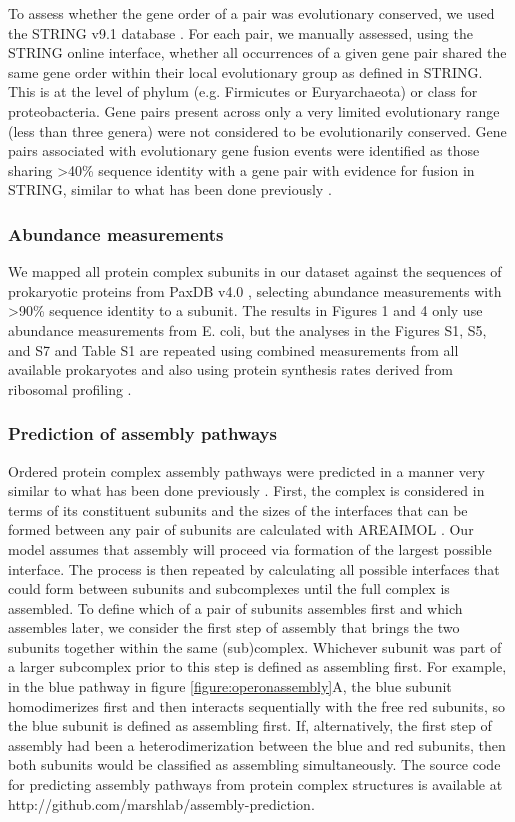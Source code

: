 \documentclass[a4paper,11pt,twoside,openright]{scrbook}
\begin{document}
To assess whether the gene order of a pair was evolutionary conserved, we used the STRING v9.1 database \cite{Franceschini2013}. For each pair, we manually assessed, using the STRING online interface, whether all occurrences of a given gene pair shared the same gene order within their local evolutionary group as defined in STRING. This is at the level of phylum (e.g. Firmicutes or Euryarchaeota) or class for proteobacteria. Gene pairs present across only a very limited evolutionary range (less than three genera) were not considered to be evolutionarily conserved. Gene pairs associated with evolutionary gene fusion events were identified as those sharing >40\% sequence identity with a gene pair with evidence for fusion in STRING, similar to what has been done previously \cite{Marsh2013}.

\subsubsection{Abundance measurements}
We mapped all protein complex subunits in our dataset against the sequences of prokaryotic proteins from PaxDB v4.0 \cite{Wang2015}, selecting abundance measurements with >90\% sequence identity to a subunit. The results in Figures 1 and 4 only use abundance measurements from E. coli, but the analyses in the Figures S1, S5, and S7 and Table S1 are repeated using combined measurements from all available prokaryotes and also using protein synthesis rates derived from ribosomal profiling \cite{Li2014b}.

\subsubsection{Prediction of assembly pathways}
Ordered protein complex assembly pathways were predicted in a manner very similar to what has been done previously \cite{Marsh2013}. First, the complex is considered in terms of its constituent subunits and the sizes of the interfaces that can be formed between any pair of subunits are calculated with AREAIMOL \cite{Winn2011}. Our model assumes that assembly will proceed via formation of the largest possible interface. The process is then repeated by calculating all possible interfaces that could form between subunits and subcomplexes until the full complex is assembled. To define which of a pair of subunits assembles first and which assembles later, we consider the first step of assembly that brings the two subunits together within the same (sub)complex. Whichever subunit was part of a larger subcomplex prior to this step is defined as assembling first. For example, in the blue pathway in figure \ref{figure:operonassembly}A, the blue subunit homodimerizes first and then interacts sequentially with the free red subunits, so the blue subunit is defined as assembling first. If, alternatively, the first step of assembly had been a heterodimerization between the blue and red subunits, then both subunits would be classified as assembling simultaneously. The source code for predicting assembly pathways from protein complex structures is available at http://github.com/marshlab/assembly-prediction.
\end{document}
